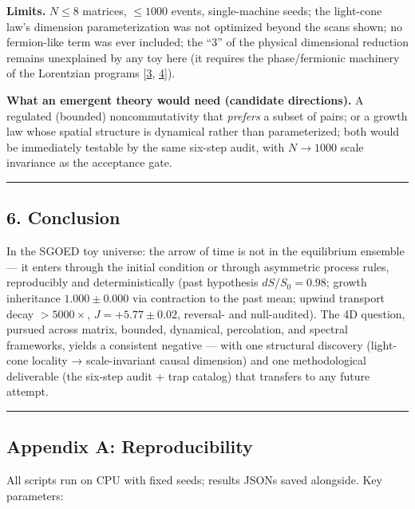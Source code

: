 \textbf{Limits.} \(N\le8\) matrices, \(\le1000\) events, single-machine
seeds; the light-cone law's dimension parameterization was not optimized
beyond the scans shown; no fermion-like term was ever included; the
``3'' of the physical dimensional reduction remains unexplained by any
toy here (it requires the phase/fermionic machinery of the Lorentzian
programs {[}\hyperref[ref-3]{3}, \hyperref[ref-4]{4}{]}).

\textbf{What an emergent theory would need (candidate directions).} A
regulated (bounded) noncommutativity that \emph{prefers} a subset of
pairs; or a growth law whose spatial structure is dynamical rather than
parameterized; both would be immediately testable by the same six-step
audit, with \(N\to1000\) scale invariance as the acceptance gate.

\begin{center}\rule{0.5\linewidth}{0.5pt}\end{center}

\subsection{6. Conclusion}\label{conclusion}

In the SGOED toy universe: the arrow of time is not in the equilibrium
ensemble --- it enters through the initial condition or through
asymmetric process rules, reproducibly and deterministically (past
hypothesis \(dS/S_0=0.98\); growth inheritance \(1.000\pm0.000\) via
contraction to the past mean; upwind transport decay \(>5000\times\),
\(J=+5.77\pm0.02\), reversal- and null-audited). The 4D question,
pursued across matrix, bounded, dynamical, percolation, and spectral
frameworks, yields a consistent negative --- with one structural
discovery (light-cone locality → scale-invariant causal dimension) and
one methodological deliverable (the six-step audit + trap catalog) that
transfers to any future attempt.

\begin{center}\rule{0.5\linewidth}{0.5pt}\end{center}

\subsection{Appendix A:
Reproducibility}\label{appendix-a-reproducibility}

All scripts run on CPU with fixed seeds; results JSONs saved alongside.
Key parameters:

